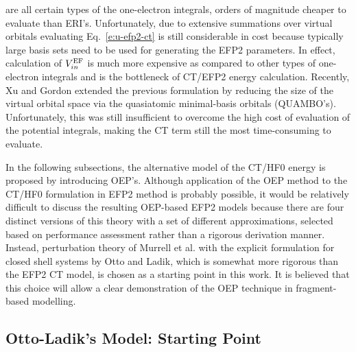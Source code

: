 \documentclass[aip,jcp,amsmath,amssymb,reprint,floatfix]{revtex4-1}
\begin{document}
are all certain types of the one\hyp{}electron integrals, orders of magnitude cheaper to
evaluate than ERI's. Unfortunately, due to extensive summations over virtual orbitals
evaluating Eq.~\eqref{e:u-efp2-ct} is still considerable in cost because typically large basis sets
need to be used for generating the EFP2 parameters. In effect, calculation of $V_{in}^{{\rm EF}}$
is much more expensive as compared to other types of one\hyp{}electron integrals
and is the bottleneck of CT/EFP2 energy calculation. Recently, Xu and Gordon
extended the previous formulation by reducing the size of the virtual orbital space
via the quasiatomic minimal\hyp{}basis orbitals (QUAMBO's).\cite{Xu.Gordon.JCP.2013} 
Unfortunately, this was still insufficient to overcome
the high cost of evaluation of the potential integrals, making the CT term still the most time\hyp{}consuming
to evaluate.

In the following subsections, the alternative model of the CT/HF0 energy is proposed
by introducing OEP's. Although application of the OEP method to the CT/HF0 formulation in EFP2 method
is probably possible, it would be relatively difficult to discuss the resulting OEP\hyp{}based
EFP2 models because there are four distinct versions of this theory
with a set of different approximations, selected based on performance assessment rather than 
a rigorous derivation manner.\cite{Li.Gordon.Jensen.JCP.2006}
Instead, perturbation theory of Murrell et al.\cite{Murrell.Randic.Williams.Longuet-Higgins.ProcRSocLondA.1965} 
with the
explicit formulation for closed shell systems by Otto and Ladik\cite{Otto.Ladik.ChemPhys.1975},
which is somewhat more rigorous than the EFP2 CT model,
is chosen as a starting point in this work. 
It is believed that this choice will allow a clear demonstration 
of the OEP technique in fragment\hyp{}based modelling.


\subsection{\label{ss:3.2.OL} Otto-Ladik's Model: Starting Point}
\end{document}
